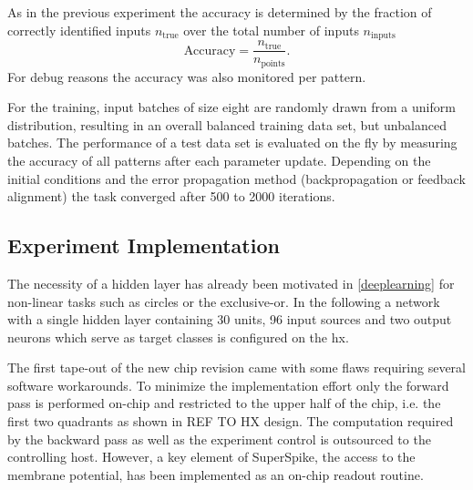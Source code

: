 As in the previous experiment the accuracy is determined by the fraction of correctly identified inputs $n_\text{true}$ over the total number of inputs $n_\text{inputs}$
\begin{equation}
\text{Accuracy} = \frac{n_\text{true}}{n_\text{points}}.
\end{equation}
For debug reasons the accuracy was also monitored per pattern.

For the training, input batches of size eight are randomly drawn from a uniform distribution, resulting in an overall balanced training data set, but unbalanced batches. The performance of a test data set is evaluated on the fly by measuring the accuracy of all patterns after each parameter update. Depending on the initial conditions and the error propagation method (backpropagation or feedback alignment) the task converged after 500 to 2000 iterations.

\subsection{Experiment Implementation}
The necessity of a hidden layer has already been motivated in \cref{deeplearning} for non-linear tasks such as circles or the exclusive-or. In the following a network with a single hidden layer containing 30 units, 96 input sources and two output neurons which serve as target classes is configured on the \gls{hx}. 

The first tape-out of the new chip revision came with some flaws requiring several software workarounds. To minimize the implementation effort only the forward pass is performed on-chip and restricted to the upper half of the chip, i.e. the first two quadrants as shown in REF TO HX design. The computation required by the backward pass as well as the experiment control is outsourced to the controlling host. However, a key element of SuperSpike, the access to the membrane potential, has been implemented as an on-chip readout routine.


